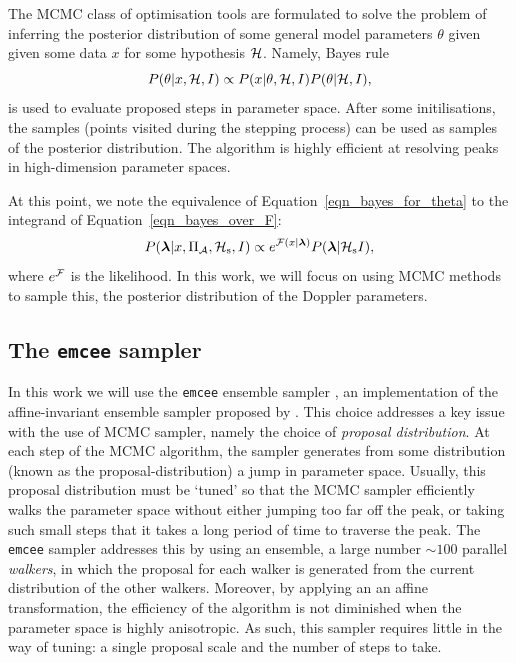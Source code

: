\documentclass[aps, prd, twocolumn, superscriptaddress, floatfix, showpacs, nofootinbib, longbibliography]{revtex4-1}
\begin{document}
The MCMC class of optimisation tools are formulated to solve the problem of
inferring the posterior distribution of some general model parameters $\theta$
given given some data $x$ for some hypothesis $\mathcal{H}$. Namely, Bayes rule
\begin{equation}
P(\theta| x, \mathcal{H}, I) \propto P(x| \theta, \mathcal{H}, I)P(\theta| \mathcal{H}, I),
\label{eqn_bayes_for_theta}
\end{equation}
is used to evaluate proposed steps in parameter space. After some
initilisations, the samples (points visited during the stepping process) can be
used as samples of the posterior distribution. The algorithm is highly
efficient at resolving peaks in high-dimension parameter spaces.

At this point, we note the equivalence of Equation~\eqref{eqn_bayes_for_theta}
to the integrand of Equation~\eqref{eqn_bayes_over_F}:
\begin{equation}
P(\boldsymbol{\mathbf{\lambda}} | x, \Pi_\mathcal{A}, \mathcal{H}_{\rm s}, I)
\propto e^{{\mathcal{F}}(x| \boldsymbol{\mathbf{\lambda}})} P(\boldsymbol{\mathbf{\lambda}}| \mathcal{H}_{\rm s} I),
\label{eqn_lambda_posterior}
\end{equation}
where $e^{{\mathcal{F}}}$ is the likelihood.
In this work, we will focus on using MCMC methods to sample this, the
posterior distribution of the Doppler parameters.

\subsection{The \texttt{emcee} sampler}

In this work we will use the \texttt{emcee} ensemble sampler
\citep{foreman-mackay2013}, an implementation of the affine-invariant ensemble
sampler proposed by \citet{goodman2010}. This choice addresses a key issue with
the use of MCMC sampler, namely the choice of \emph{proposal distribution}. At
each step of the MCMC algorithm, the sampler generates from some distribution
(known as the proposal-distribution) a jump in parameter space. Usually, this
proposal distribution must be `tuned' so that the MCMC sampler efficiently
walks the parameter space without either jumping too far off the peak, or
taking such small steps that it takes a long period of time to traverse the
peak. The \texttt{emcee} sampler addresses this by using an ensemble, a large
number ${\sim}100$ parallel \emph{walkers}, in which the proposal for each
walker is generated from the current distribution of the other walkers.
Moreover, by applying an an affine transformation, the efficiency of the
algorithm is not diminished when the parameter space is highly anisotropic. As
such, this sampler requires little in the way of tuning: a single proposal
scale and the number of steps to take.
\end{document}

